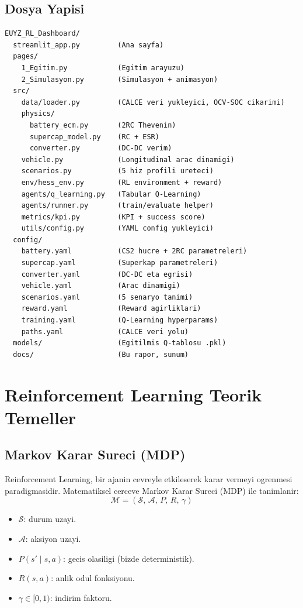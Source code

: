 \documentclass[11pt,a4paper]{article}
\begin{document}
\subsection{Dosya Yapisi}

\begin{lstlisting}[style=yaml,caption={Proje dizin yapisi}]
EUYZ_RL_Dashboard/
  streamlit_app.py         (Ana sayfa)
  pages/
    1_Egitim.py            (Egitim arayuzu)
    2_Simulasyon.py        (Simulasyon + animasyon)
  src/
    data/loader.py         (CALCE veri yukleyici, OCV-SOC cikarimi)
    physics/
      battery_ecm.py       (2RC Thevenin)
      supercap_model.py    (RC + ESR)
      converter.py         (DC-DC verim)
    vehicle.py             (Longitudinal arac dinamigi)
    scenarios.py           (5 hiz profili ureteci)
    env/hess_env.py        (RL environment + reward)
    agents/q_learning.py   (Tabular Q-Learning)
    agents/runner.py       (train/evaluate helper)
    metrics/kpi.py         (KPI + success score)
    utils/config.py        (YAML config yukleyici)
  config/
    battery.yaml           (CS2 hucre + 2RC parametreleri)
    supercap.yaml          (Superkap parametreleri)
    converter.yaml         (DC-DC eta egrisi)
    vehicle.yaml           (Arac dinamigi)
    scenarios.yaml         (5 senaryo tanimi)
    reward.yaml            (Reward agirliklari)
    training.yaml          (Q-Learning hyperparams)
    paths.yaml             (CALCE veri yolu)
  models/                  (Egitilmis Q-tablosu .pkl)
  docs/                    (Bu rapor, sunum)
\end{lstlisting}

\section{Reinforcement Learning Teorik Temeller}

\subsection{Markov Karar Sureci (MDP)}

Reinforcement Learning, bir ajanin cevreyle etkileserek karar vermeyi ogrenmesi paradigmasidir. Matematiksel cerceve Markov Karar Sureci (MDP) ile tanimlanir:
\[
\mathcal{M} = (\mathcal{S},\, \mathcal{A},\, P,\, R,\, \gamma)
\]
\begin{itemize}
  \item $\mathcal{S}$: durum uzayi.
  \item $\mathcal{A}$: aksiyon uzayi.
  \item $P(s' \mid s, a)$: gecis olasiligi (bizde deterministik).
  \item $R(s, a)$: anlik odul fonksiyonu.
  \item $\gamma \in [0, 1)$: indirim faktoru.
\end{itemize}
\end{document}
